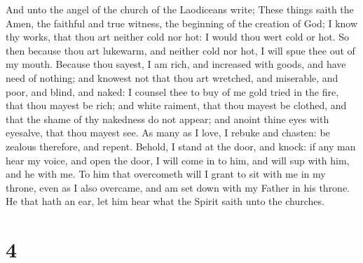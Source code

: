  And unto the angel of the church of the Laodiceans
write; These things saith the Amen, the faithful and true witness, the
beginning of the creation of God;  I know thy works, that
thou art neither cold nor hot: I would thou wert cold or hot.
 So then because thou art lukewarm, and neither cold nor
hot, I will spue thee out of my mouth.  Because thou
sayest, I am rich, and increased with goods, and have need of nothing;
and knowest not that thou art wretched, and miserable, and poor, and
blind, and naked:  I counsel thee to buy of me gold tried
in the fire, that thou mayest be rich; and white raiment, that thou
mayest be clothed, and that the shame of thy nakedness do not appear;
and anoint thine eyes with eyesalve, that thou mayest see.
 As many as I love, I rebuke and chasten: be zealous
therefore, and repent.  Behold, I stand at the door, and
knock: if any man hear my voice, and open the door, I will come in to
him, and will sup with him, and he with me.  To him that
overcometh will I grant to sit with me in my throne, even as I also
overcame, and am set down with my Father in his throne. 
He that hath an ear, let him hear what the Spirit saith unto the
churches.

\hypertarget{section-3}{%
\section{4}\label{section-3}}

